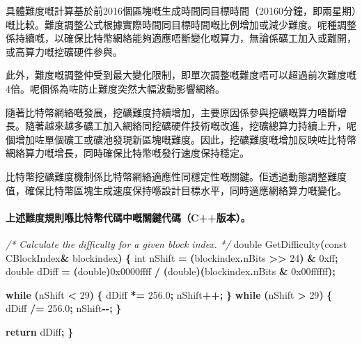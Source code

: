 \documentclass[
]{article}
\newenvironment{Shaded}{\begin{snugshade}}{\end{snugshade}}
\newcommand{\AttributeTok}[1]{\textcolor[rgb]{0.13,0.29,0.53}{#1}}
\newcommand{\BaseNTok}[1]{\textcolor[rgb]{0.00,0.00,0.81}{#1}}
\newcommand{\CommentTok}[1]{\textcolor[rgb]{0.56,0.35,0.01}{\textit{#1}}}
\newcommand{\ControlFlowTok}[1]{\textcolor[rgb]{0.13,0.29,0.53}{\textbf{#1}}}
\newcommand{\DataTypeTok}[1]{\textcolor[rgb]{0.13,0.29,0.53}{#1}}
\newcommand{\DecValTok}[1]{\textcolor[rgb]{0.00,0.00,0.81}{#1}}
\newcommand{\FloatTok}[1]{\textcolor[rgb]{0.00,0.00,0.81}{#1}}
\newcommand{\NormalTok}[1]{#1}
\newcommand{\OperatorTok}[1]{\textcolor[rgb]{0.81,0.36,0.00}{\textbf{#1}}}
\begin{document}
具體難度嘅計算基於前2016個區塊嘅生成時間同目標時間（20160分鐘，即兩星期）嘅比較。難度調整公式根據實際時間同目標時間嘅比例增加或減少難度。呢種調整係持續嘅，以確保比特幣網絡能夠適應唔斷變化嘅算力，無論係礦工加入或離開，或高算力嘅挖礦硬件參與。

此外，難度嘅調整仲受到最大變化限制，即單次調整嘅難度唔可以超過前次難度嘅4倍。呢個係為咗防止難度突然大幅波動影響網絡。

隨著比特幣網絡嘅發展，挖礦難度持續增加，主要原因係參與挖礦嘅算力唔斷增長。隨著越來越多礦工加入網絡同挖礦硬件技術嘅改進，挖礦總算力持續上升，呢個增加咗單個礦工或礦池發現新區塊嘅難度。因此，挖礦難度嘅增加反映咗比特幣網絡算力嘅增長，同時確保比特幣嘅發行速度保持穩定。

比特幣挖礦難度機制係比特幣網絡適應性同穩定性嘅關鍵。佢透過動態調整難度值，確保比特幣區塊生成速度保持喺設計目標水平，同時適應網絡算力嘅變化。

\paragraph{上述難度規則喺比特幣代碼中嘅關鍵代碼（C++版本）。}\label{ux4e0aux8ff0ux96e3ux5ea6ux898fux5247ux55baux6bd4ux7279ux5e63ux4ee3ux78bcux4e2dux5605ux95dcux9375ux4ee3ux78bccux7248ux672c}

\begin{Shaded}
\begin{Highlighting}[numbers=left,,]
\CommentTok{/* Calculate the difficulty for a given block index.}
\CommentTok{ */}
\DataTypeTok{double}\NormalTok{ GetDifficulty}\OperatorTok{(}\AttributeTok{const}\NormalTok{ CBlockIndex}\OperatorTok{\&}\NormalTok{ blockindex}\OperatorTok{)}
\OperatorTok{\{}
    \DataTypeTok{int}\NormalTok{ nShift }\OperatorTok{=} \OperatorTok{(}\NormalTok{blockindex}\OperatorTok{.}\NormalTok{nBits }\OperatorTok{\textgreater{}\textgreater{}} \DecValTok{24}\OperatorTok{)} \OperatorTok{\&} \BaseNTok{0xff}\OperatorTok{;}
    \DataTypeTok{double}\NormalTok{ dDiff }\OperatorTok{=}
        \OperatorTok{(}\DataTypeTok{double}\OperatorTok{)}\BaseNTok{0x0000ffff} \OperatorTok{/} \OperatorTok{(}\DataTypeTok{double}\OperatorTok{)(}\NormalTok{blockindex}\OperatorTok{.}\NormalTok{nBits }\OperatorTok{\&} \BaseNTok{0x00ffffff}\OperatorTok{);}

    \ControlFlowTok{while} \OperatorTok{(}\NormalTok{nShift }\OperatorTok{\textless{}} \DecValTok{29}\OperatorTok{)}
    \OperatorTok{\{}
\NormalTok{        dDiff }\OperatorTok{*=} \FloatTok{256.0}\OperatorTok{;}
\NormalTok{        nShift}\OperatorTok{++;}
    \OperatorTok{\}}
    \ControlFlowTok{while} \OperatorTok{(}\NormalTok{nShift }\OperatorTok{\textgreater{}} \DecValTok{29}\OperatorTok{)}
    \OperatorTok{\{}
\NormalTok{        dDiff }\OperatorTok{/=} \FloatTok{256.0}\OperatorTok{;}
\NormalTok{        nShift}\OperatorTok{{-}{-};}
    \OperatorTok{\}}

    \ControlFlowTok{return}\NormalTok{ dDiff}\OperatorTok{;}
\OperatorTok{\}}
\end{Highlighting}
\end{Shaded}
\end{document}
